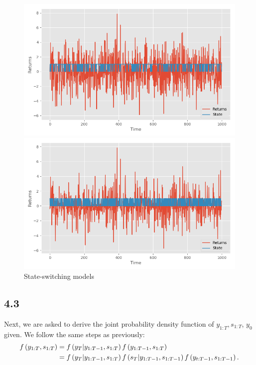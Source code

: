 \documentclass[11pt,a4paper,oneside]{article}
\newcommand{\lp}{\left(}
\newcommand{\rp}{\right)}
\begin{document}
\begin{figure}[ht]
\centering
\captionsetup{justification=centering,margin=0.6cm}
\caption{State-switching models}
\begin{minipage}[b]{0.45\linewidth}
\includegraphics[scale = 0.45]{images/942.png}
\end{minipage}
\hspace{0.5cm}
\begin{minipage}[b]{0.45\linewidth}
\centering
\includegraphics[scale = 0.45]{images/931b.png}
\end{minipage}
\begingroup
{}
\endgroup
\end{figure}

\subsection{4.3}
Next, we are asked to derive the joint probability density function of $y_{1:T}, s_{1:T}$, $y_0$ given. We follow the same steps as previously:
\begin{align}
    f\lp y_{1:T}, s_{1:T}\rp 
        &= f\lp y_T \vert y_{1:T-1}, s_{1:T}\rp f\lp y_{1:T-1}, s_{1:T}\rp \notag \\
        &= f\lp y_T \vert y_{1:T-1}, s_{1:T}\rp f\lp s_T \vert y_{1:T-1}, s_{1:T-1}\rp f\lp y_{t:T-1}, s_{1:T-1}\rp.
\end{align}
\end{document}
